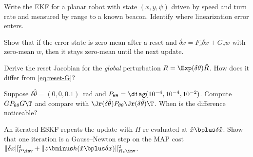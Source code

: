 \begin{exercises}
  \item Write the EKF for a planar robot with state $(x, y, \psi)$ driven by speed and turn rate and measured by
        range to a known beacon. Identify where linearization error enters.
  \item Show that if the error state is zero-mean after a reset and $\dot{\delta x} = F_c\delta x + G_cw$ with
        zero-mean $w$, then it stays zero-mean until the next update.
  \item Derive the reset Jacobian for the \emph{global} perturbation $R = \Exp(\delta\theta)\hat R$. How does it differ
        from \eqref{eq:reset-G}?
  \item Suppose $\delta\hat\theta = (0, 0, 0.1)$~rad and $P_{\theta\theta} = \diag(10^{-4}, 10^{-4}, 10^{-2})$. Compute
        $GP_{\theta\theta}G\T$ and compare with $\Jr(\delta\hat\theta)P_{\theta\theta}\Jr(\delta\hat\theta)\T$. When is the difference
        noticeable?
  \item An iterated ESKF repeats the update with $H$ re-evaluated at $\hat x\bplus\delta\hat x$. Show that one
        iteration is a Gauss--Newton step on the MAP cost $\|\delta x\|^2_{P\inv} + \|z\bminus h(\hat x\bplus\delta x)\|^2_{R_z\inv}$.
\end{exercises}
